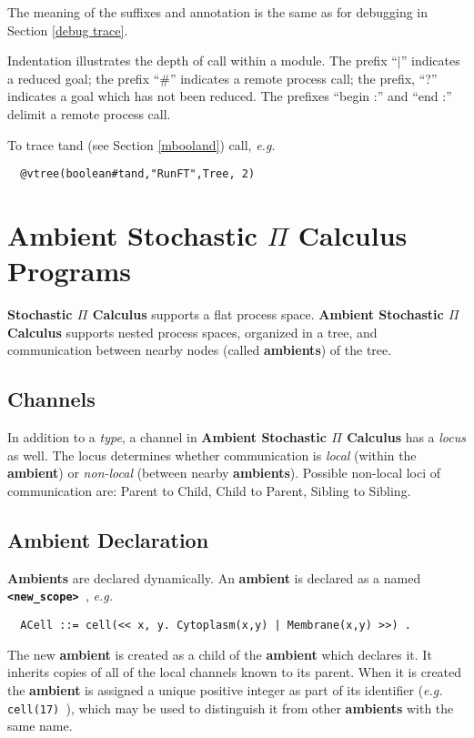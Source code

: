 \documentclass[twoside,10pt]{report}
\begin{document}
\noindent
The meaning of the suffixes and annotation is the same as for
debugging in Section \ref{debug trace}.

\noindent
Indentation illustrates the depth of call within a module.
The prefix ``$|$'' indicates a reduced goal; the prefix
``\#'' indicates a remote process call; the prefix,
``?''  indicates a goal which has not been reduced.  The
prefixes ``begin :'' and ``end :'' delimit a remote process
call.

\noindent
To trace tand (see Section \ref{mbooland}) call, {\em e.g.}

\begin{verbatim}
  @vtree(boolean#tand,"RunFT",Tree, 2)
\end{verbatim}

\chapter{Ambient Stochastic $\Pi$ Calculus Programs}
\label{aspic}

{\bf Stochastic $\Pi$ Calculus} supports a flat process space.
{\bf Ambient Stochastic $\Pi$ Calculus} supports nested process spaces,
organized in a tree, and
communication between nearby nodes (called {\bf ambients}) of the tree.

\section{Channels}

In addition to a {\em type}, a channel in {\bf Ambient Stochastic $\Pi$ Calculus}
has a {\em locus} as well.  The
locus determines whether communication is {\em local}
(within the {\bf ambient})
or {\em non-local} (between nearby {\bf ambients}).  Possible non-local loci of
communication are: Parent to Child, Child to Parent, Sibling to Sibling.

\section{Ambient Declaration}

{\bf Ambients} are declared dynamically.
An {\bf ambient} is declared as a named {\bf \verb+ <new_scope> +}, {\em e.g.}

\begin{verbatim}
  ACell ::= cell(<< x, y. Cytoplasm(x,y) | Membrane(x,y) >>) .
\end{verbatim}

The new {\bf ambient} is created as a child of the {\bf ambient} which declares it.
It inherits copies of all of the local channels known to its parent.
When it is created the {\bf ambient} is assigned a unique positive integer
as part of its identifier ({\em e.g.} \verb+ cell(17) +), which may be used
to distinguish it from other {\bf ambients} with the same name.
\end{document}
